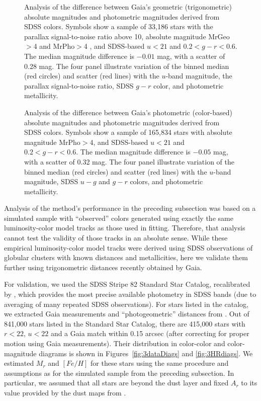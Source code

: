 \begin{figure}[ht!]
\caption{Analysis of the difference between Gaia's geometric (trigonometric) absolute magnitudes and photometric magnitudes
  derived from SDSS colors. Symbols show a sample of 33,186 stars with the parallax signal-to-noise ratio above 10, absolute
  magnitude MrGeo$>$4 and MrPho$>$4 , and SDSS-based $u<21$ and $0.2 < g-r < 0.6$. The median magnitude difference is
  $-0.01$ mag, with a scatter of 0.28 mag. The four panel illustrate variation of the binned median (red circles) and scatter (red
  lines) with the $u$-band magnitude, the parallax signal-to-noise ratio, SDSS $g-r$ color, and photometric metallicity.} 
\label{fig:gaiasdss1}
\end{figure}




\begin{figure}[ht!]
\caption{Analysis of the difference between Gaia's photometric (color-based) absolute magnitudes and photometric magnitudes
  derived from SDSS colors. Symbols show a sample of 165,834 stars with absolute magnitude MrPho$>$4, and SDSS-based $u<21$
  and $0.2 < g-r < 0.6$. The median magnitude difference is $-0.05$ mag, with a scatter of 0.32 mag. The four panel illustrate
  variation of the binned median (red circles) and scatter (red lines) with the $u$-band magnitude, SDSS $u-g$ and $g-r$ colors,
  and photometric metallicity.}
\label{fig:gaiasdss2}
\end{figure}



Analysis of the method's performance in the preceding subsection was based on a simulated sample with ``observed'' colors generated using
exactly the same luminosity-color model tracks as those used in fitting. Therefore, that analysis cannot test the validity of those tracks in an absolute sense.
While these empirical luminosity-color model tracks were derived using SDSS observations of
globular clusters with known distances and metallicities, here we validate them further using trigonometric distances recently obtained by Gaia.  

For validation, we used the SDSS Stripe 82 Standard Star Catalog, recalibrated by \cite{2021MNRAS.505.5941T},
which provides the most precise available photometry in SDSS bands (due to averaging of many repeated SDSS observations). 
For stars listed in the catalog, we extracted Gaia measurements and ``photogeometric'' distances from 
\cite{bailer-jones_estimating_2021}. Out of 841,000 stars listed in the Standard Star Catalog, there are 415,000 stars with $r < 22$, $u<22$ and a Gaia
match within 0.15 arcsec (after correcting for proper motion using Gaia measurements). Their distribution in color-color and
color-magnitude diagrams is shown in Figures~\ref{fig:3dataDiags} and \ref{fig:3HRdiags}. 
We estimated $M_r$ and $[Fe/H]$ for these stars using the same procedure and assumptions as for the simulated sample from the
preceding subsection. In particular, we assumed that all stars are beyond the dust layer and fixed $A_r$ to its value provided by the dust
maps from \cite{schlegel_maps_1998}.

